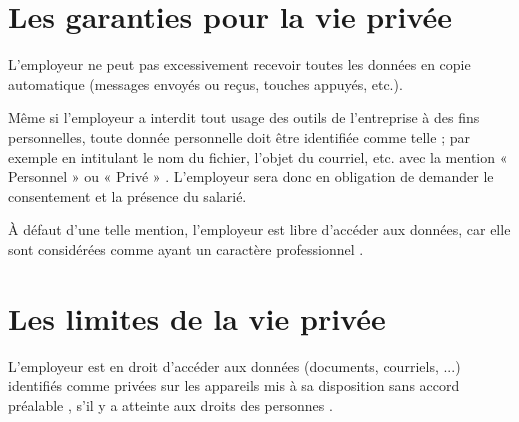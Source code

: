 \documentclass[final, a4paper, 13pt]{article}
\begin{document}
\begin{multicols}{2}
\section{Les garanties pour la vie privée}
L’employeur ne peut pas excessivement recevoir toutes les données en copie automatique (messages envoyés ou reçus, touches appuyés, etc.).

Même si l'employeur a interdit tout usage des outils de l’entreprise à des fins personnelles,
toute donnée personnelle doit être identifiée comme telle ; par exemple en intitulant le nom du fichier, l'objet du courriel, etc. avec la mention « Personnel » ou « Privé »
\cite{garantie-secret}. L'employeur sera donc en obligation de demander le consentement et la présence du salarié.

À défaut d'une telle mention, l'employeur est libre d'accéder aux données, car elle sont considérées 
comme ayant un caractère professionnel \cite{Cass0448}.

\section{Les limites de la vie privée}
L'employeur est en droit d’accéder aux données (documents, courriels, ...) identifiés comme privées
sur les appareils mis à sa disposition sans accord préalable \cite{L2313-2},
s'il y a atteinte aux droits des personnes \cite{L1121-1}.

\end{multicols}

\vspace*{\fill}
\end{document}
